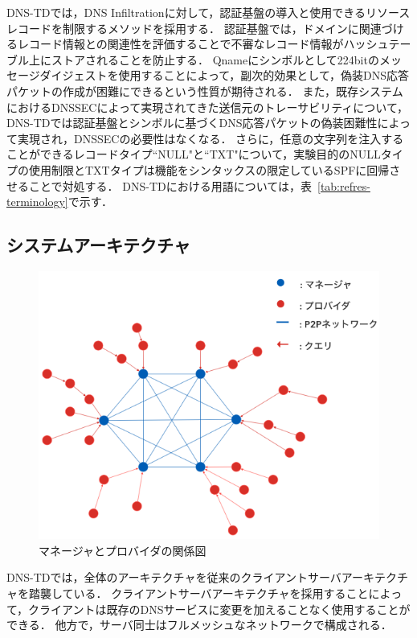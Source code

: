 DNS-TDでは，DNS Infiltrationに対して，認証基盤の導入と使用できるリソースレコードを制限するメソッドを採用する．
認証基盤では，ドメインに関連づけるレコード情報との関連性を評価することで不審なレコード情報がハッシュテーブル上にストアされることを防止する．
Qnameにシンボルとして224bitのメッセージダイジェストを使用することによって，副次的効果として，偽装DNS応答パケットの作成が困難にできるという性質が期待される．
また，既存システムにおけるDNSSECによって実現されてきた送信元のトレーサビリティについて，DNS-TDでは認証基盤とシンボルに基づくDNS応答パケットの偽装困難性によって実現され，DNSSECの必要性はなくなる．
さらに，任意の文字列を注入することができるレコードタイプ``NULL"と``TXT"について，実験目的のNULLタイプの使用制限とTXTタイプは機能をシンタックスの限定しているSPFに回帰させることで対処する．
DNS-TDにおける用語については，表~\ref{tab:refres-terminology}で示す．


\newpage
\subsection{システムアーキテクチャ}
\begin{figure}[htbp]
 \centering
 \includegraphics[scale=0.5]{figure/manager-provider.png}
 \caption{マネージャとプロバイダの関係図}
 \label{fig:manager-provider}
\end{figure}

DNS-TDでは，全体のアーキテクチャを従来のクライアントサーバアーキテクチャを踏襲している．
クライアントサーバアーキテクチャを採用することによって，クライアントは既存のDNSサービスに変更を加えることなく使用することができる．
他方で，サーバ同士はフルメッシュなネットワークで構成される．

